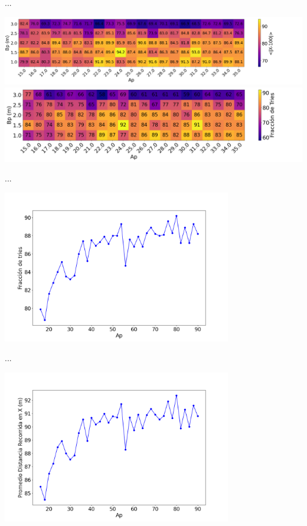 \begin{frame}{...}
    \begin{center}
        \includegraphics[width=\textwidth]{pic/05-resultados/r3}
        \includegraphics[width=\textwidth]{pic/05-resultados/r4}
    \end{center}
\end{frame}


\begin{frame}{...}
    \begin{center}
        \includegraphics[width=0.75\textwidth]{pic/05-resultados/r5}
    \end{center}
\end{frame}

\begin{frame}{...}
    \begin{center}
        \includegraphics[width=0.75\textwidth]{pic/05-resultados/r6}
    \end{center}
\end{frame}

